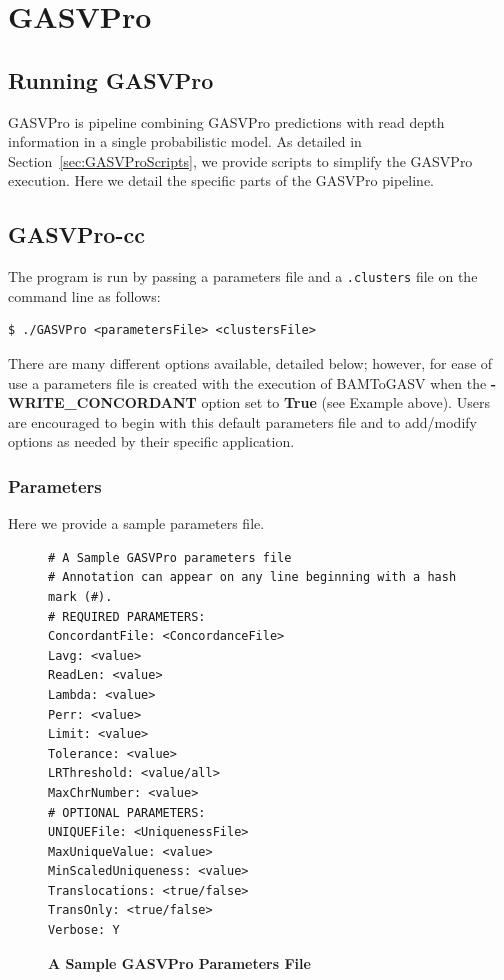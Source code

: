 \documentclass[11pt]{article}
\begin{document}
\section{GASVPro}

\subsection{Running GASVPro}

GASVPro is pipeline combining GASVPro predictions with read depth information in a single probabilistic model. As detailed in Section~\ref{sec:GASVProScripts}, we provide scripts to simplify the GASVPro execution. Here we detail the specific parts of the GASVPro pipeline.

\subsection{GASVPro-cc}

The program is run by passing a parameters file and a \verb+.clusters+ file on the command line as follows:
\begin{Verbatim}[frame=single]
$ ./GASVPro <parametersFile> <clustersFile>
\end{Verbatim}
 There are many different options available, detailed below; however, for ease of use a parameters file is created with the execution of BAMToGASV when the {\bf-WRITE\_CONCORDANT} option set to {\bf True} (see Example above). Users are encouraged to begin with this default parameters file and to add/modify options as needed by their specific application.

\subsubsection{Parameters} 

Here we provide a sample parameters file. 
\begin{figure}[H]
\begin{Verbatim}[frame=single]
# A Sample GASVPro parameters file
# Annotation can appear on any line beginning with a hash mark (#).
# REQUIRED PARAMETERS:
ConcordantFile: <ConcordanceFile>
Lavg: <value>
ReadLen: <value>
Lambda: <value>
Perr: <value>
Limit: <value>
Tolerance: <value>
LRThreshold: <value/all>
MaxChrNumber: <value>
# OPTIONAL PARAMETERS: 
UNIQUEFile: <UniquenessFile>
MaxUniqueValue: <value>
MinScaledUniqueness: <value>
Translocations: <true/false>
TransOnly: <true/false>
Verbose: Y
\end{Verbatim}
\caption{\bf A Sample GASVPro Parameters File}
\end{figure}
\end{document}
